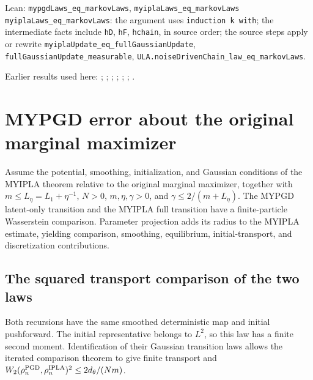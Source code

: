 \documentclass[11pt,a4paper]{report}
\begin{document}
\begin{leanbox}{Lean: \texttt{mypgdLaws\_\allowbreak{}eq\_\allowbreak{}markovLaws}, \texttt{myiplaLaws\_\allowbreak{}eq\_\allowbreak{}markovLaws}}
\texttt{myipla\allowbreak{}Laws\_\allowbreak{}eq\_\allowbreak{}markov\allowbreak{}Laws}: the argument uses \texttt{induction k with}; the intermediate facts include \texttt{h\allowbreak{}D}, \texttt{h\allowbreak{}F}, \texttt{hchain}, in source order; the source steps apply or rewrite \texttt{myipla\allowbreak{}Update\_\allowbreak{}eq\_\allowbreak{}full\allowbreak{}Gaussian\allowbreak{}Update}, \texttt{full\allowbreak{}Gaussian\allowbreak{}Update\_\allowbreak{}measurable}, \texttt{ULA.\allowbreak{}noise\allowbreak{}Driven\allowbreak{}Chain\_\allowbreak{}law\_\allowbreak{}eq\_\allowbreak{}markov\allowbreak{}Laws}.
\end{leanbox}


Earlier results used here: \cite[Section~3.20.1]{LangevinLean2026ULASC}; \cite[Section~3.33.12]{LangevinLean2026ULASC}; \cite[Section~3.33.6]{LangevinLean2026ULASC}; \cite[Section~3.41.2]{LangevinLean2026ULASC}; \cite[Section~3.41.3]{LangevinLean2026ULASC}; \cite[Section~3.1.1]{LangevinLean2026IPLA}; \cite[Section~3.3.2]{LangevinLean2026IPLA}.
\section{\texorpdfstring{MYPGD error about the original marginal maximizer}{MYPGD error about the original marginal maximizer}}
\label{proof-module-ProximalLangevin-MYPGDTheorem-lean}


Assume the potential, smoothing, initialization, and Gaussian conditions of the MYIPLA theorem relative to the original marginal maximizer, together with \(m\le L_\eta=L_1+\eta^{-1}\), \(N>0\), \(m,\eta,\gamma>0\), and \(\gamma\le2/(m+L_\eta)\). The MYPGD latent-only transition and the MYIPLA full transition have a finite-particle Wasserstein comparison. Parameter projection adds its radius to the MYIPLA estimate, yielding comparison, smoothing, equilibrium, initial-transport, and discretization contributions.

\subsection{\texorpdfstring{The squared transport comparison of the two laws}{The squared transport comparison of the two laws}}
\label{report-step-ProximalLangevin-MYPGDTheorem-lean-1}


Both recursions have the same smoothed deterministic map and initial pushforward. The initial representative belongs to \(L^2\), so this law has a finite second moment. Identification of their Gaussian transition laws allows the iterated comparison theorem to give finite transport and \(W_2(\rho_n^{\rm PGD},\rho_n^{\rm IPLA})^2\le2d_\theta/(Nm)\).
\end{document}
